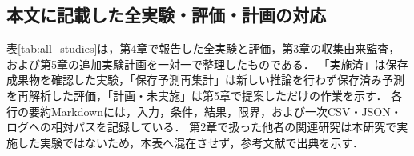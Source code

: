 \documentclass[uplatex,dvipdfmx]{jsarticle}
\begin{document}
\endgroup

\subsection{本文に記載した全実験・評価・計画の対応}

表\ref{tab:all_studies}は，第4章で報告した全実験と評価，第3章の収集由来監査，および第5章の追加実験計画を一対一で整理したものである．
「実施済」は保存成果物を確認した実験，「保存予測再集計」は新しい推論を行わず保存済み予測を再解析した評価，「計画・未実施」は第5章で提案しただけの作業を示す．
各行の要約Markdownには，入力，条件，結果，限界，および一次CSV・JSON・ログへの相対パスを記録している．
第2章で扱った他者の関連研究は本研究で実施した実験ではないため，本表へ混在させず，参考文献で出典を示す．

\begingroup
\footnotesize
\setlength{\tabcolsep}{2.5pt}
\renewcommand{\arraystretch}{1.15}
\end{document}
